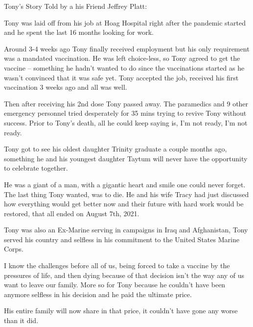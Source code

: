 Tony’s Story Told by a his Friend Jeffrey Platt:

Tony was laid off from his job at Hoag Hospital right after the pandemic started
and he spent the last 16 months looking for work.

Around 3-4 weeks ago Tony finally received employment but his only requirement
was a mandated vaccination. He was left choice-less, so Tony agreed to get the
vaccine – something he hadn’t wanted to do since the vaccinations started as he
wasn’t convinced that it was safe yet. Tony accepted the job, received his first
vaccination 3 weeks ago and all was well.

Then after receiving his 2nd dose Tony passed away. The paramedics and 9 other
emergency personnel tried desperately for 35 mins trying to revive Tony without
success. Prior to Tony’s death, all he could keep saying is, I’m not ready, I’m
not ready.

Tony got to see his oldest daughter Trinity graduate a couple months ago,
something he and his youngest daughter Taytum will never have the opportunity to
celebrate together.

He was a giant of a man, with a gigantic heart and smile one could never
forget. The last thing Tony wanted, was to die. He and his wife Tracy had just
discussed how everything would get better now and their future with hard work
would be restored, that all ended on August 7th, 2021.

Tony was also an Ex-Marine serving in campaigns in Iraq and Afghanistan, Tony
served his country and selfless in his commitment to the United States Marine
Corps.

I know the challenges before all of us, being forced to take a vaccine by the
pressures of life, and then dying because of that decision isn’t the way any of
us want to leave our family. More so for Tony because he couldn’t have been
anymore selfless in his decision and he paid the ultimate price.

His entire family will now share in that price, it couldn’t have gone any worse
than it did.
